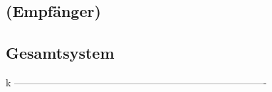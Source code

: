%


\clearpage
\subsection{\Master (Empf\"anger)}
\label{subsec:simu:ask:recv}


\subsection{Gesamtsystem}
\label{subsec:simu:ask:total}
k ---------------------------------------------------------------------------- %
